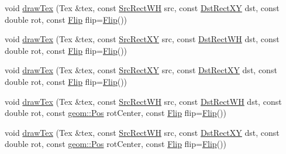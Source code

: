 \begin{DoxyCompactItemize}
\item 
void \mbox{\hyperlink{classrolmodl_1_1blend_mode_1_1_ren_a3cb7f52b90797c4c5429dcca9fee47bc}{draw\+Tex}} (Tex \&tex, const \mbox{\hyperlink{structrolmodl_1_1blend_mode_1_1_src_rect_w_h}{Src\+Rect\+WH}} src, const \mbox{\hyperlink{structrolmodl_1_1blend_mode_1_1_dst_rect_x_y}{Dst\+Rect\+XY}} dst, const double rot, const \mbox{\hyperlink{structrolmodl_1_1blend_mode_1_1_flip}{Flip}} flip=\mbox{\hyperlink{structrolmodl_1_1blend_mode_1_1_flip}{Flip}}())
\item 
void \mbox{\hyperlink{classrolmodl_1_1blend_mode_1_1_ren_abea6eb70b2024cff14ac9d26ffadacd4}{draw\+Tex}} (Tex \&tex, const \mbox{\hyperlink{structrolmodl_1_1blend_mode_1_1_src_rect_x_y}{Src\+Rect\+XY}} src, const \mbox{\hyperlink{structrolmodl_1_1blend_mode_1_1_dst_rect_w_h}{Dst\+Rect\+WH}} dst, const double rot, const \mbox{\hyperlink{structrolmodl_1_1blend_mode_1_1_flip}{Flip}} flip=\mbox{\hyperlink{structrolmodl_1_1blend_mode_1_1_flip}{Flip}}())
\item 
void \mbox{\hyperlink{classrolmodl_1_1blend_mode_1_1_ren_a9a98d8e5c0195f9f0a0a016fd9dfaf0b}{draw\+Tex}} (Tex \&tex, const \mbox{\hyperlink{structrolmodl_1_1blend_mode_1_1_src_rect_x_y}{Src\+Rect\+XY}} src, const \mbox{\hyperlink{structrolmodl_1_1blend_mode_1_1_dst_rect_x_y}{Dst\+Rect\+XY}} dst, const double rot, const \mbox{\hyperlink{structrolmodl_1_1blend_mode_1_1_flip}{Flip}} flip=\mbox{\hyperlink{structrolmodl_1_1blend_mode_1_1_flip}{Flip}}())
\item 
void \mbox{\hyperlink{classrolmodl_1_1blend_mode_1_1_ren_adf77534fcf212ab386ee2bb224ed4bce}{draw\+Tex}} (Tex \&tex, const \mbox{\hyperlink{structrolmodl_1_1blend_mode_1_1_src_rect_w_h}{Src\+Rect\+WH}} src, const \mbox{\hyperlink{structrolmodl_1_1blend_mode_1_1_dst_rect_w_h}{Dst\+Rect\+WH}} dst, const double rot, const \mbox{\hyperlink{structrolmodl_1_1geom_1_1_pos}{geom\+::\+Pos}} rot\+Center, const \mbox{\hyperlink{structrolmodl_1_1blend_mode_1_1_flip}{Flip}} flip=\mbox{\hyperlink{structrolmodl_1_1blend_mode_1_1_flip}{Flip}}())
\item 
void \mbox{\hyperlink{classrolmodl_1_1blend_mode_1_1_ren_aefc656cae1724bd85a35555097b20d37}{draw\+Tex}} (Tex \&tex, const \mbox{\hyperlink{structrolmodl_1_1blend_mode_1_1_src_rect_w_h}{Src\+Rect\+WH}} src, const \mbox{\hyperlink{structrolmodl_1_1blend_mode_1_1_dst_rect_x_y}{Dst\+Rect\+XY}} dst, const double rot, const \mbox{\hyperlink{structrolmodl_1_1geom_1_1_pos}{geom\+::\+Pos}} rot\+Center, const \mbox{\hyperlink{structrolmodl_1_1blend_mode_1_1_flip}{Flip}} flip=\mbox{\hyperlink{structrolmodl_1_1blend_mode_1_1_flip}{Flip}}())

\end{DoxyCompactItemize}
